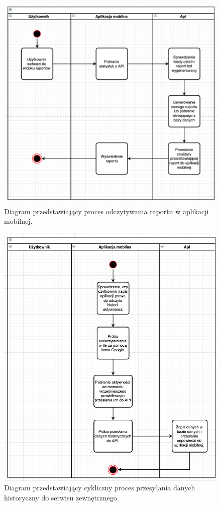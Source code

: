 \documentclass[a4paper,twoside,12pt]{book}
\begin{document}
\begin{figure}[!htbp]
    \centering
    \includegraphics[scale=0.5]{images/raport-uml.png}
    \caption{Diagram przedstawiający proces odczytywania raportu w aplikacji mobilnej.}
    \label{fig:raport_uml}
\end{figure}

\begin{figure}[!htbp]
    \centering
    \includegraphics[scale=0.5]{images/cyclic-stats-uml.png}
    \caption{Diagram przedstawiający cykliczny proces przesyłania danych historyczny do serwisu zewnętrznego.}
    \label{fig:cyclic_stats_uml}
\end{figure}
\end{document}
